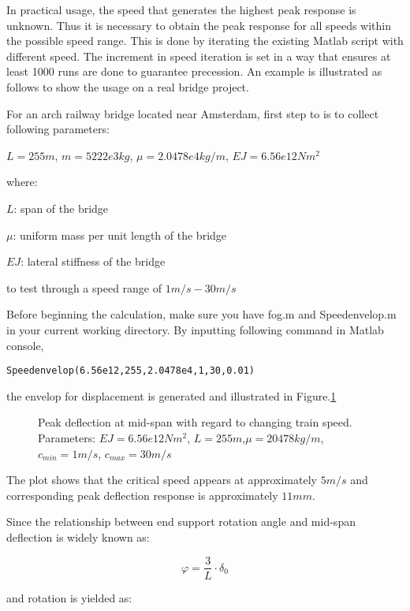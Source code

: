 In practical usage, the speed that generates the highest peak response is unknown. Thus it is necessary to obtain the peak response for all speeds within the possible speed range. This is done by iterating the existing Matlab script with different speed. The increment in speed iteration is set in a way that ensures at least 1000 runs are done to guarantee precession. An example is illustrated as follows to show the usage on a real bridge project.

For an arch railway bridge located near Amsterdam, first step to is to collect following parameters:

$L = 255m$, $m = 5222e3kg$, $\mu = 2.0478e4 kg/m$, $EJ = 6.56e12Nm^2$

where:

$L$: span of the bridge

$\mu$: uniform mass per unit length of the bridge

$EJ$: lateral stiffness of the bridge

to test through a speed range of $1m/s - 30m/s$

Before beginning the calculation, make sure you have fog.m and Speedenvelop.m in your current working directory. By inputting following command in Matlab console, 

\texttt{Speedenvelop(6.56e12,255,2.0478e4,1,30,0.01)}


the envelop for displacement is generated and illustrated in Figure.\ref{fig:spedefEJ6560000000000L255min1max30mu20478.tikz}

\begin{figure}[h!]
\centering 
\setlength\figureheight{6cm} 
\setlength\figurewidth{6cm} 
 
\caption{Peak deflection at mid-span with regard to changing train speed. Parameters: $EJ = 6.56e12Nm^2$, $L= 255m$,$\mu = 20478 kg/m$, $c_{min}=1m/s$, $c_{max} = 30m/s$} 
\label{fig:spedefEJ6560000000000L255min1max30mu20478.tikz} 
\end{figure}

The plot shows that the critical speed appears at approximately $5m/s$ and corresponding peak deflection response is approximately $11mm$. 

Since the relationship between end support rotation angle and mid-span deflection is widely known as:

$$ \varphi = \frac{3}{L}\cdot \delta_0  $$

and rotation is yielded as:

